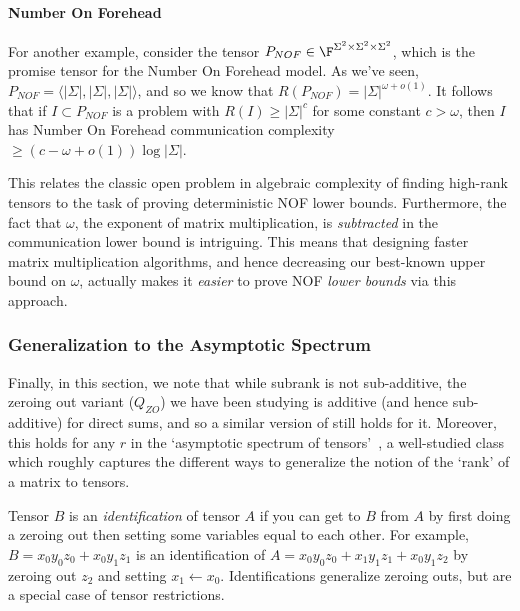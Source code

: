 \paragraph{Number On Forehead}
For another example, consider the tensor $P_{NOF} \in \F^{\Sigma^2 \times \Sigma^2 \times \Sigma^2}$, which is the promise tensor for the Number On Forehead model. As we've seen, $P_{NOF} = \langle |\Sigma|, |\Sigma|, |\Sigma| \rangle$, and so we know that $R(P_{NOF}) = |\Sigma|^{\omega + o(1)}$. It follows that if $I \subset P_{NOF}$ is a problem with $R(I) \geq |\Sigma|^{c}$ for some constant $c > \omega$, then $I$ has Number On Forehead communication complexity $\geq (c - \omega + o(1)) \log |\Sigma|$. 

This relates the classic open problem in algebraic complexity of finding high-rank tensors to the task of proving deterministic NOF lower bounds. Furthermore, the fact that $\omega$, the exponent of matrix multiplication, is \emph{subtracted} in the communication lower bound is intriguing. This means that designing faster matrix multiplication algorithms, and hence decreasing our best-known upper bound on $\omega$, actually makes it \emph{easier} to prove NOF \emph{lower bounds} via this approach.


\subsubsection{Generalization to the Asymptotic Spectrum}

Finally, in this section, we note that while subrank is not sub-additive, the zeroing out variant ($Q_{ZO}$) we have been studying is additive (and hence sub-additive) for direct sums, and so a similar version of  still holds for it. Moreover, this holds for any $r$ in the `asymptotic spectrum of tensors'~\cite{S86,WZ22}, a well-studied class which roughly captures the different ways to generalize the notion of the `rank' of a matrix to tensors.

\begin{definition}
    Tensor $B$ is an \emph{identification} of tensor $A$ if you can get to $B$ from $A$ by first doing a zeroing out then setting some variables equal to each other. For example, $B = x_0 y_0 z_0 + x_0 y_1 z_1$ is an identification of $A = x_0 y_0 z_0 + x_1 y_1 z_1 + x_0 y_1 z_2$ by zeroing out $z_2$ and setting $x_1 \leftarrow x_0$. Identifications generalize zeroing outs, but are a special case of tensor restrictions.
\end{definition}

